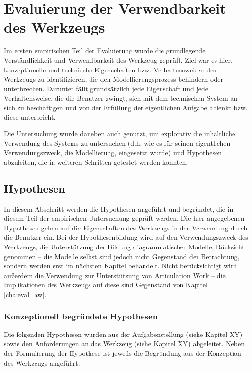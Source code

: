 \chapter{Evaluierung der Verwendbarkeit des Werkzeugs} %
\label{cha:eval_werkzeug}

Im ersten empirischen Teil der Evaluierung wurde die grundlegende Verständlichkeit und Verwendbarkeit des Werkzeug geprüft. Ziel war es hier, konzeptionelle und technische Eigenschaften bzw. Verhaltensweisen des Werkzeugs zu identifizieren, die den Modellierungsprozess behindern oder unterbrechen. Darunter fällt grundsätzlich jede Eigenschaft und jede Verhaltensweise, die die Benutzer zwingt, sich mit dem technischen System an sich zu beschäftigen und von der Erfüllung der eigentlichen Aufgabe ablenkt bzw. diese unterbricht.

Die Untersuchung wurde daneben auch genutzt, um explorativ die inhaltliche Verwendung des Systems zu untersuchen (d.h. wie es für seinen eigentlichen Verwendungszweck, die Modellierung, eingesetzt wurde) und Hypothesen abzuleiten, die in weiteren Schritten getestet werden konnten.

\section{Hypothesen} %
\label{sec:hypothesen}

In diesem Abschnitt werden die Hypothesen angeführt und begründet, die in diesem Teil der empirischen Untersuchung geprüft werden. Die hier angegebenen Hypothesen gehen auf die Eigenschaften des Werkzeugs in der Verwendung durch die Benutzer ein. Bei der Hypothesenbildung wird auf den Verwendungszweck des Werkzeugs, die Unterstützung der Bildung diagrammatischer Modelle, Rücksicht genommen -- die Modelle selbst sind jedoch nicht Gegenstand der Betrachtung, sondern werden erst im nächsten Kapitel behandelt. Nicht berücksichtigt wird außerdem die Verwendung zur Unterstützung von Articulation Work -- die Implikationen des Werkzeugs auf diese sind Gegenstand von Kapitel \ref{cha:eval_aw}.

\subsection{Konzeptionell begründete Hypothesen} %
\label{sub:konzeptionell_begründete_hypothesen}

Die folgenden Hypothesen wurden aus der Aufgabenstellung (siehe Kapitel XY) sowie den Anforderungen an das Werkzeug (siehe Kapitel XY) abgeleitet. Neben der Formulierung der Hypothese ist jeweils die Begründung aus der Konzeption des Werkzeugs angeführt.

